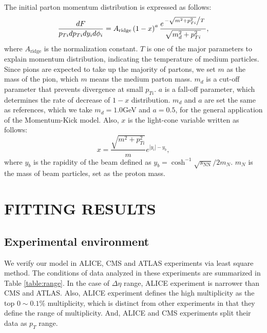\documentclass[jkps,fleqn,showpacs,showkeys]{revtex4}
\begin{document}
The initial parton momentum distribution is expressed as follows:
\begin{equation} \label{equation:eq6}
\frac{dF}{p_{Ti}dp_{Ti}dy_id\phi_i}=A_{\text{ridge}}\left(1-x\right)^a\frac{e^{ \left. -\sqrt{m^2+p_{Ti}^2} \middle/ T \right. }}{\sqrt{m_d^2+p_{Ti}^2}},
\end{equation}
where $A_{\text{ridge}}$ is the normalization constant.
$T$ is one of the major parameters to explain momentum distribution, indicating the temperature of medium particles.
Since pions are expected to take up the majority of partons, we set $m$ as the mass of the pion, which $m$ means the medium parton mass.
$m_d$ is a cut-off parameter that prevents divergence at small $p_{Ti}$.
$a$ is a fall-off parameter, which determines the rate of decrease of $1-x$ distribution.
$m_d$ and $a$ are set the same as references\cite{PbPb, Wong_1}, which we take $m_d = 1.0$GeV and $a = 0.5$, for the general application of the Momentum-Kick model\cite{Wong_1}.
Also, $x$ is the light-cone variable written as follows:
\begin{equation} \label{equation:eq8}
x=\frac{\sqrt{m^2+p_{Ti}^2}}{m}e^{\left|y_i\right|-y_b},
\end{equation}
where $y_b$ is the rapidity of the beam defined as $y_b=\cosh^{-1}{\sqrt{s_\text{NN}}/2m_N}$. $m_N$ is the mass of beam particles, set as the proton mass.


\section*{FITTING RESULTS}
\label{sec:FITTING RESULTS}

\subsection{Experimental environment}
\label{subsec:Experimental environment}

We verify our model in ALICE, CMS and ATLAS experiments\cite{alice,cms,atlas} via least square method.
The conditions of data analyzed in these experiments are summarized in Table \ref{table:range}.
In the case of $\Delta\eta$ range, ALICE experiment is narrower than CMS and ATLAS.
Also, ALICE experiment defines the high multiplicity as the top $0\sim0.1\%$ multiplicity, which is distinct from other experiments in that they define the range of multiplicity.
And, ALICE and CMS experiments split their data as $p_T$ range.
\end{document}
